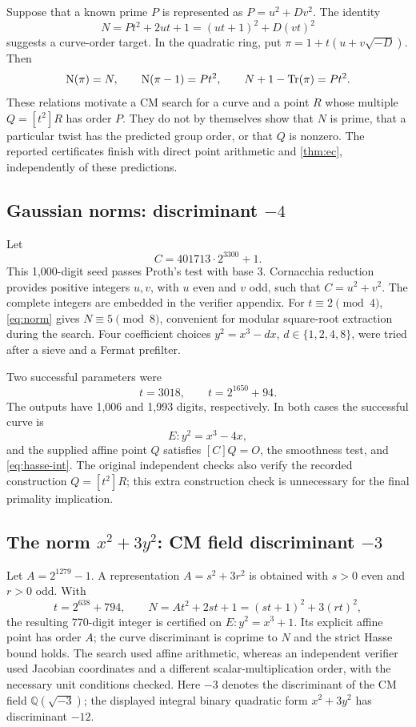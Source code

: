 \documentclass[11pt,a4paper]{article}
\theoremstyle{definition}\newtheorem{definition}[theorem]{Definition}
\theoremstyle{remark}\newtheorem{remark}[theorem]{Remark}
\begin{document}
Suppose that a known prime $P$ is represented as $P=u^2+Dv^2$. The identity
\begin{equation}\label{eq:norm}
 N=Pt^2+2ut+1=(ut+1)^2+D(vt)^2
\end{equation}
suggests a curve-order target. In the quadratic ring, put
$\pi=1+t(u+v\sqrt{-D})$. Then
\[
 \operatorname{N}(\pi)=N,\qquad \operatorname{N}(\pi-1)=Pt^2,
 \qquad N+1-\operatorname{Tr}(\pi)=Pt^2.
\]
These relations motivate a CM search for a curve and a point $R$ whose
multiple $Q=[t^2]R$ has order $P$. They do not by themselves show that $N$ is
prime, that a particular twist has the predicted group order, or that $Q$ is
nonzero. The reported certificates finish with direct point arithmetic and
\cref{thm:ec}, independently of these predictions.

\subsection{Gaussian norms: discriminant \texorpdfstring{$-4$}{-4}}

Let
\begin{equation}\label{eq:C}
 C=401713\cdot2^{3300}+1.
\end{equation}
This 1,000-digit seed passes Proth's test with base $3$. Cornacchia reduction
provides positive integers $u,v$, with $u$ even and $v$ odd, such that
$C=u^2+v^2$. The complete integers are embedded in the verifier appendix.
For $t\equiv2\pmod4$, \eqref{eq:norm} gives $N\equiv5\pmod8$, convenient for
modular square-root extraction during the search. Four coefficient choices
$y^2=x^3-dx$, $d\in\{1,2,4,8\}$, were tried after a sieve and a Fermat
prefilter.

Two successful parameters were
\[
 t=3018,\qquad t=2^{1650}+94.
\]
The outputs have 1,006 and 1,993 digits, respectively. In both cases the
successful curve is
\[
 E:y^2=x^3-4x,
\]
and the supplied affine point $Q$ satisfies $[C]Q=O$, the smoothness test,
and \eqref{eq:hasse-int}. The original independent checks also verify the
recorded construction $Q=[t^2]R$; this extra construction check is unnecessary
for the final primality implication.

\subsection{\texorpdfstring{The norm $x^2+3y^2$: CM field discriminant $-3$}{The norm x squared plus 3y squared: CM field discriminant -3}}

Let $A=2^{1279}-1$. A representation $A=s^2+3r^2$ is obtained with $s>0$
even and $r>0$ odd. With
\[
 t=2^{638}+794,\qquad
 N=At^2+2st+1=(st+1)^2+3(rt)^2,
\]
the resulting 770-digit integer is certified on
$E:y^2=x^3+1$. Its explicit affine point has order $A$; the curve
discriminant is coprime to $N$ and the strict Hasse bound holds.
The search used affine arithmetic, whereas an independent verifier used
Jacobian coordinates and a different scalar-multiplication order, with the
necessary unit conditions checked.
Here $-3$ denotes the discriminant of the CM field $\mathbb Q(\sqrt{-3})$;
the displayed integral binary quadratic form $x^2+3y^2$ has discriminant $-12$.
\end{document}
